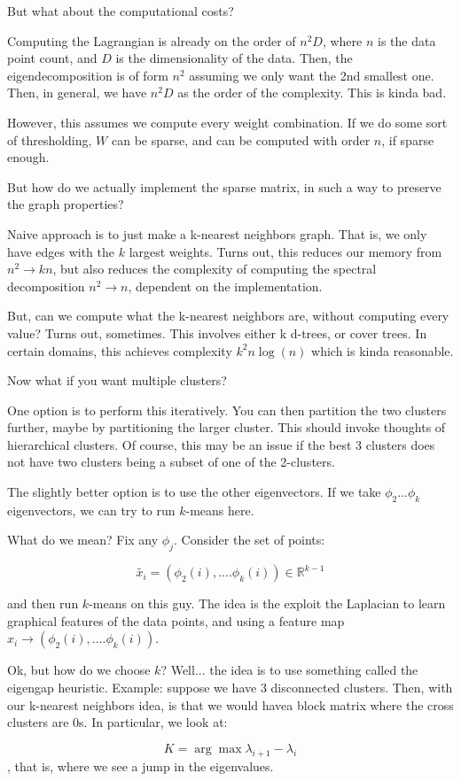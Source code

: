 \documentclass[10pt]{article}
\begin{document}
But what about the computational costs?

Computing the Lagrangian is already on the order of $n^2D$, where $n$ is the data point count, and $D$ is the dimensionality of the data. Then, the eigendecomposition is of form $n^2$ assuming we only want the 2nd smallest one. Then, in general, we have $n^2D$ as the order of the complexity. This is kinda bad.

However, this assumes we compute every weight combination. If we do some sort of thresholding, $W$ can be sparse, and can be computed with order $n$, if sparse enough. 

But how do we actually implement the sparse matrix, in such a way to preserve the graph properties?

Naive approach is to just make a k-nearest neighbors graph. That is, we only have edges with the $k$ largest weights. Turns out, this reduces our memory from $n^2 \to kn$, but also reduces the complexity of computing the spectral decomposition $n^2 \to n$, dependent on the implementation.

But, can we compute what the k-nearest neighbors are, without computing every value? Turns out, sometimes. This involves either k d-trees, or cover trees. In certain domains, this achieves complexity $k^2 n \log(n)$ which is kinda reasonable.

Now what if you want multiple clusters? 

One option is to perform this iteratively. You can then partition the two clusters further, maybe by partitioning the larger cluster. This should invoke thoughts of hierarchical clusters. Of course, this may be an issue if the best 3 clusters does not have two clusters being a subset of one of the 2-clusters. 

The slightly better option is to use the other eigenvectors. If we take $\phi_2...\phi_k$ eigenvectors, we can try to run $k$-means here. 

What do we mean? Fix any $\phi_j$. Consider the set of points:

$$\tilde{x_i} = (\phi_2(i), ....\phi_k(i)) \in \mathbb{R}^{k-1}$$

and then run $k$-means on this guy. The idea is the exploit the Laplacian to learn graphical features of the data points, and using a feature map $x_i \to  (\phi_2(i), ....\phi_k(i))$.

Ok, but how do we choose $k$? Well... the idea is to use something called the eigengap heuristic. Example: suppose we have 3 disconnected clusters. Then, with our k-nearest neighbors idea, is that we would havea block matrix where the cross clusters are 0s. In particular, we look at:

$$K = \arg \max \lambda_{i+1} - \lambda_i $$, that is, where we see a jump in the eigenvalues. 
\end{document}
